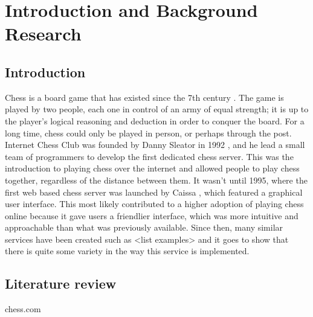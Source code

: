 \chapter{Introduction and Background Research}

\label{chapter1}

\section{Introduction}

Chess is a board game that has existed since the 7th century \cite{AHistoryOfChess}. The game is played by two people, each one in control of an army of equal strength; it is up to the player's logical reasoning and deduction in order to conquer the board. For a long time, chess could only be played in person, or perhaps through the post. Internet Chess Club was founded by Danny Sleator in 1992 \cite{InternetChessClub}, and he lead a small team of programmers to develop the first dedicated chess server. This was the introduction to playing chess over the internet and allowed people to play chess together, regardless of the distance between them. It wasn't until 1995, where the first web based chess server was launched by Caissa \cite{Caissa}, which featured a graphical user interface. This most likely contributed to a higher adoption of playing chess online because it gave users a friendlier interface, which was more intuitive and approachable than what was previously available. Since then, many similar services have been created such as <list examples> and it goes to show that there is quite some variety in the way this service is implemented.


\section{Literature review}
chess.com
